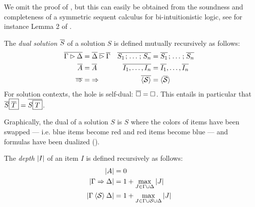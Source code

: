 We omit the proof of , but this can easily be obtained from the
soundness and completeness of a symmetric sequent calculus for bi-intuitionistic
logic, see for instance Lemma 2 of .

\begin{definition}
  The \emph{dual solution} $\overline{S}$ of a solution $S$ is defined
  mutually recursively as follows:
  \begin{align*}
    \soldual{\Gamma \J \Delta} &= \soldual{\Delta} \mathbin{\soldual{\J}} \soldual{\Gamma} &
    \soldual{S_1 \sep \ldots \sep S_n} &= \soldual{S_1} \sep \ldots \sep \soldual{S_n} \\
    \soldual{A} &= \soldual{A} &
    \soldual{I_1, \ldots, I_n} &= \soldual{I_1}, \ldots, \soldual{I_n} \\
    \soldual{\seq} &= {\seq} &
    \soldual{\piq{\mathcal{S}}} &= \piq{\soldual{\mathcal{S}}}
  \end{align*}
  For solution contexts, the hole is self-dual: $\overline{\square} = \square$. This
  entails in particular that $\overline{S}\fbox{$\overline{T}$} =
  \overline{S\fbox{$T$}}$.
\end{definition}

Graphically, the dual of a solution $S$ is $S$ where the colors of items have
been swapped --- i.e. blue items become red and red items become blue --- and
formulas have been dualized ().

\begin{definition}
  The \emph{depth} $\left|I\right|$ of an item $I$ is defined recursively as
  follows:
  \begin{align*}
    \left|A\right| &= 0 \\
    \left|\Gamma \Rightarrow \Delta\right| &= 1 + \max_{J \in \Gamma \cup \Delta}{\left|J\right|} \\
    \left|\Gamma \mathbin{\langle \mathcal{S} \rangle} \Delta\right| &= 1 + \max_{J \in \Gamma \cup \mathcal{S} \cup \Delta}{\left|J\right|}
  \end{align*}
\end{definition}

